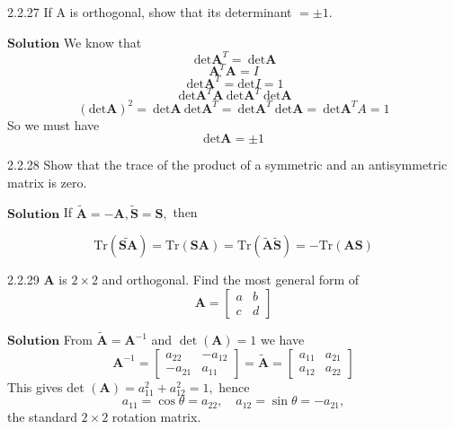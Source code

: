 \documentclass{article}
\begin{document}
\begin{flushleft}
\begin{mybox}{2.2.27}
If A is orthogonal, show that its determinant $=\pm 1 .$
\end{mybox}



$\boxed{\textbf{Solution}}$ We know that
$$\ \text{det} \mathbf{A}^T = \ \text{det} \mathbf{A}$$
$$\mathbf{A}^T\mathbf{A}=I$$
$$\ \text{det} \mathbf{A}^T = \text{det}I = 1$$
$$\ \text{det} \mathbf{A}^T\mathbf{A} \ \text{det} \mathbf{A}^T \ \text{det} \mathbf{A}$$
$$(\text{det} \mathbf{A})^2 = \ \text{det} \mathbf{A} \ \text{det} \mathbf{A}^T = \ \text{det} \mathbf{A}^T \ \text{det} \mathbf{A} = \ \text{det} \mathbf{A}^TA = 1$$
So we must have
$$\text{det}\mathbf{A} = \pm 1$$



















\begin{mybox}{2.2.28}
Show that the trace of the product of a symmetric and an antisymmetric matrix is zero.
\end{mybox}


$\boxed{\textbf{Solution}}$  
If $\tilde{\mathbf{A}}=-\mathbf{A}, \tilde{\mathbf{S}}=\mathbf{S},$ then

$$\text{Tr}(\widetilde{\mathbf{SA}})=\text{Tr}(\mathbf{SA})=\text{Tr}(\tilde{\mathbf{A}} \tilde{\mathbf{S}})=-\text{Tr}(\mathbf{AS})$$





\begin{mybox}{2.2.29}
$\mathbf{A}$ is $2 \times 2$ and orthogonal. Find the most general form of
$$
\mathbf{A}=\begin{bmatrix}{a} & {b} \\ {c} & {d}\end{bmatrix}
$$
\end{mybox}

$\boxed{\textbf{Solution}}$  From $\tilde{\mathbf{A}}=\mathbf{A}^{-1}$ and $\operatorname{det}(\mathbf{A})=1$ we have
$$
\mathbf{A}^{-1}=\begin{bmatrix}{a_{22}} & {-a_{12}} \\ {-a_{21}} & {a_{11}}\end{bmatrix}=\tilde{\mathbf{A}}=\begin{bmatrix}{a_{11}} & {a_{21}} \\ {a_{12}} & {a_{22}}\end{bmatrix}
$$
This gives det $(\mathbf{A})=a_{11}^{2}+a_{12}^{2}=1,$ hence 
$$a_{11}=\cos \theta=a_{22},\quad  a_{12}=\sin \theta=-a_{21},$$
the standard $2 \times 2$ rotation matrix.








\end{flushleft}
\end{document}
